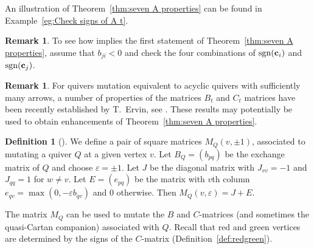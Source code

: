 \documentclass[11pt, letterpaper]{amsart}
\newcommand{\cS}[1]{{\noindent\textsf{\color{purple}$\blacksquare$~#1~$\blacksquare$}}}
\theoremstyle{definition}
\newtheorem{remark}[theorem]{Remark}
\newtheorem{definition}[theorem]{Definition}
\numberwithin{equation}{section}
\newcommand\sgn{\operatorname{sgn}}
\begin{document}
An illustration of Theorem~\ref{thm:seven A properties} can be found in Example~\ref{eg:Check signs of A t}. 

\begin{remark}
To see how \cite[Theorem 1.3]{SevenAMatrices} implies the first 
statement of Theorem~\ref{thm:seven A properties}, assume that $b_{ji} < 0$ 
and check the four combinations of $\sgn(\bold c_i)$ and~$\sgn(\bold c_j)$. 
\end{remark}

\begin{remark}
For quivers mutation equivalent to acyclic quivers with sufficiently many arrows, 
a number of properties of the matrices $B_t$ and $C_t$ matrices  
have been recently established by T.~Ervin, see \cite[Proposition~5.2, Lemma~5.4]{ErvinRedSize}. %
These results may potentially be used to obtain enhancements of Theorem~\ref{thm:seven A properties}.
\end{remark}


\begin{definition}[{\cite[Theorem 2.8.3]{CAtextbook1-3}}]
\label{def:mutation mat}
We define a pair of square matrices $M_Q(v, \pm 1)$, associated to mutating a quiver $Q$ at a given vertex $v$.
Let ${B_Q=(b_{pq})}$ be the exchange matrix of $Q$ and choose $\varepsilon = \pm 1$. 
Let $J$ be the diagonal matrix with $J_{vv} = -1$ and $J_{qq}=1$ for $w \neq v$.
Let $E = (e_{pq})$ be the matrix with $v$th column $e_{qv} = \max(0,-\varepsilon b_{qv})$ and $0$ otherwise.
Then $M_Q(v, \varepsilon) = J + E$. %
\end{definition}

The matrix $M_Q$ can be used to mutate the $B$ and $C$-matrices (and sometimes the quasi-Cartan companion) associated with $Q$.
Recall that red and green vertices are determined by the signs of the $C$-matrix (Definition~\ref{def:redgreen}).
\end{document}
